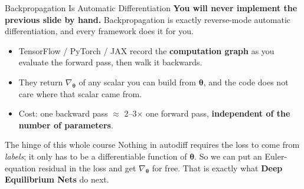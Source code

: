 \documentclass[aspectratio=169,11pt]{beamer}
\newcommand{\emphc}[1]{\textcolor{harvardcrimson}{#1}}
\begin{document}
\begin{frame}{Backpropagation Is Automatic Differentiation}
\textbf{You will never implement the previous slide by hand.}  Backpropagation is exactly \emphc{reverse-mode automatic differentiation}, and every framework does it for you.

\vspace{0.25cm}
\begin{itemize}\itemsep3pt
    \item TensorFlow / PyTorch / JAX record the \textbf{computation graph} as you evaluate the forward pass, then walk it backwards.
    \item They return $\nabla_{\bm{\theta}}$ of \emphc{any scalar} you can build from $\bm{\theta}$, and the code does not care where that scalar came from.
    \item Cost: one backward pass $\approx$ 2--3$\times$ one forward pass, \textbf{independent of the number of parameters}.
\end{itemize}

\vspace{0.25cm}
\begin{exampleblock}{The hinge of this whole course}
\small Nothing in autodiff requires the loss to come from \emph{labels}; it only has to be a differentiable function of $\bm{\theta}$.  So we can put an \emphc{Euler-equation residual} in the loss and get $\nabla_{\bm{\theta}}$ for free.  That is exactly what \textbf{Deep Equilibrium Nets} do next.
\end{exampleblock}
\end{frame}
\end{document}

